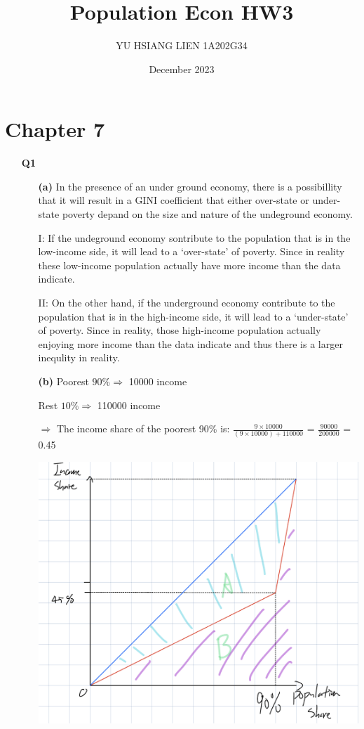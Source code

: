 \documentclass[12pt]{article}
\title{Population Econ HW3}
\author{YU HSIANG LIEN 1A202G34}
\date{December 2023}
\begin{document}
\maketitle

\section{Chapter 7}
\begin{enumerate}
    \item [\textbf{Q1}] 
    
    \begin{enumerate}
        \item[\textbf{(a)}] In the presence of an under ground economy, there is a possibillity that it 
        will result in a GINI coefficient that either over-state or under-state poverty 
        depand on the size and nature of the undeground economy.
        \newline

        I: If the undeground economy sontribute to the population that is in the low-income side,
        it will lead to a `over-state' of poverty. Since in reality these low-income population actually 
        have more income than the data indicate.
        \newline

        II: On the other hand, if the underground economy contribute to the population that is in the 
        high-income side, it will lead to a `under-state' of poverty. Since in reality, those high-income 
        population actually enjoying more income than the data indicate and thus there is a larger
        inequlity in reality.

        \item[\textbf{(b)}]
        Poorest $ 90\%\Rightarrow$ 10000 income 

        Rest $ 10\%\Rightarrow$ 110000 income 

        $\Rightarrow$ The income share of the poorest 90\% is: $\frac{9 \times 10000}{(9 \times 10000) + 110000}$ = $\frac{90000}{200000}$  = 0.45 

        \includegraphics[width=0.5\linewidth]{hw3_img1.jpeg} \newpage


\end{enumerate}
\end{enumerate}
\end{document}
